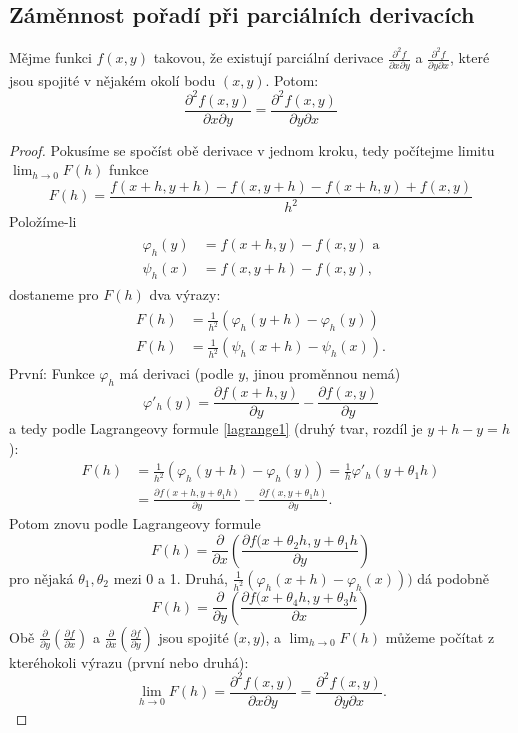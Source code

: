\documentclass[../main.tex]{subfiles}
\begin{document}
\subsection{Záměnnost pořadí při parciálních derivacích}
\begin{theorem}
	Mějme funkci $f(x,y)$ takovou, že existují parciální derivace
	$\frac{\partial ^2 f}{\partial x \partial y}$ a $\frac{\partial ^2 f}{\partial y \partial x}$, které
	jsou spojité v nějakém okolí bodu $(x,y)$. Potom:
	\[ \frac{\partial ^2 f(x,y)}{\partial x \partial y} = \frac{\partial ^2 f(x,y)}{\partial y \partial x} \]
\end{theorem}

\begin{proof}
	Pokusíme se spočíst obě derivace v jednom kroku, tedy počítejme limitu $\lim_{h\rightarrow 0} F(h)$ funkce
	\[F(h) = \frac{f(x+h,y+h) - f(x,y+h) - f(x+h,y) + f(x,y)}{h^2}\]
	Položíme-li 
	\begin{align*} 
		\begin{split}
			\varphi_h(y) & = f(x+h,y) - f(x,y)\text{ a}\\
			\psi_h(x) & = f(x,y+h) - f(x,y),
		\end{split}
	\end{align*}
	dostaneme pro $F(h)$ dva výrazy:
	\begin{align*} 
		\begin{split}
			F(h) & = \frac{1}{h^2} (\varphi_h(y+h) - \varphi_h(y))\\
			F(h) & = \frac{1}{h^2} (\psi_h(x+h)-\psi_h(x)).
		\end{split}
	\end{align*}
	První: Funkce $\varphi_h$ má derivaci (podle $y$, jinou proměnnou nemá)
	\[\varphi'_h(y)=\frac{\partial f(x+h,y)}{\partial y}-\frac{\partial f(x,y)}{\partial y}\]
	a tedy podle Lagrangeovy formule \ref{lagrange1} (druhý tvar, rozdíl je $y + h - y = h$):
	\begin{align*}
		F(h) & = \frac{1}{h^2}(\varphi_h(y+h)-\varphi_h(y)) = \frac{1}{h}\varphi'_h(y+\theta_1h)\\
		& = \frac{\partial f(x+h,y+\theta_1h)}{\partial y} -\frac{\partial f(x,y+\theta_1h)}{\partial y}.
	\end{align*}
	Potom znovu podle Lagrangeovy formule
	\[F(h) = \frac{\partial }{\partial x}\left(\frac{\partial f(x+\theta_2h,y+\theta_1h}{\partial y}\right)\]
	pro nějaká $\theta_1,\theta_2$ mezi 0 a 1.
	Druhá, $\frac{1}{h^2}(\varphi_h(x+h) - \varphi_h(x)))$ dá podobně
	\[F(h) = \frac{\partial }{\partial y}\left(\frac{\partial f(x+\theta_4h,y + \theta_3h}{\partial x}\right)\]
	Obě $\frac{\partial }{\partial y}(\frac{\partial f}{\partial x})$ a $\frac{\partial }{\partial x}(\frac{\partial f}{\partial y})$ jsou spojité ($x,y$), a $\lim_{h\rightarrow 0} F(h)$ můžeme počítat z kteréhokoli výrazu (první nebo druhá):
	\[\lim_{h\rightarrow 0}F(h) = \frac{\partial ^2 f(x,y)}{\partial x \partial y} 
	                            = \frac{\partial ^2 f(x,y)}{\partial y \partial x}.\]
\end{proof}
\end{document}
